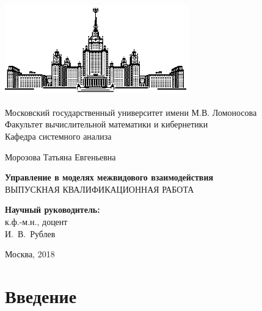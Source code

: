 \documentclass[11pt]{article}
\theoremstyle{definition}
\begin{document}
\begin{titlepage}
\begin{center}
\includegraphics[width=8cm, height=4cm]{MSU}
\end{center}
\begin{center}
Московский государственный университет имени М.В. Ломоносова\\
\vspace{0.1 cm}
Факультет вычислительной математики и кибернетики\\
\vspace{0.1 cm}
Кафедра системного анализа

\vspace{3cm}
{\Large Морозова Татьяна Евгеньевна }\\
\vspace{1cm}

{\bf\LARGE Управление в моделях межвидового взаимодействия}\\ \vspace{2cm}
ВЫПУСКНАЯ КВАЛИФИКАЦИОННАЯ РАБОТА

\end{center}
\vspace{2cm}
\begin{flushright}

{\bf Научный руководитель:}\\
к.ф.-м.н., доцент\\ 
И.~В.~Рублев

\end{flushright}

 \vspace{4.5cm}

\centerline {Москва, 2018}

\end{titlepage}

\newpage
\tableofcontents
\newpage

\section{Введение}
\end{document}

